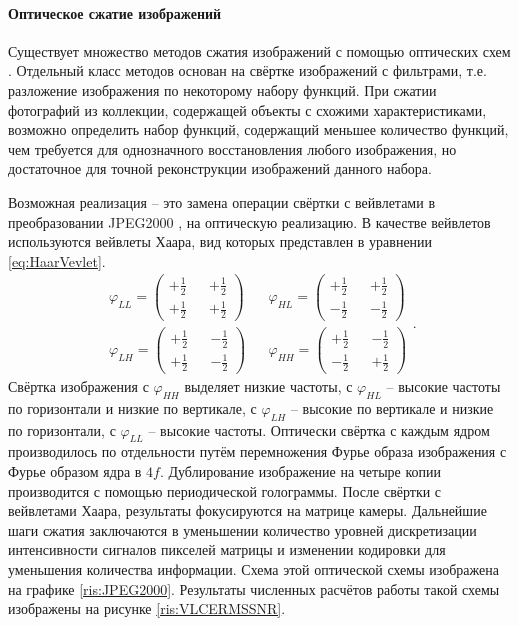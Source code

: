 \paragraph{Оптическое сжатие изображений}
Существует множество методов сжатия изображений с помощью оптических схем \cite{alfalou2009optical}. Отдельный класс методов основан на свёртке изображений с фильтрами, т.е. разложение изображения по некоторому набору функций. При сжатии фотографий из коллекции, содержащей объекты с схожими характеристиками, возможно определить набор функций, содержащий меньшее количество функций, чем требуется для однозначного восстановления любого изображения, но достаточное для точной реконструкции изображений данного набора.

\FloatBarrier\par
Возможная реализация -- это замена операции свёртки с вейвлетами \cite{alkholidi2008real} в преобразовании JPEG2000 \cite{lawson2002image}, на оптическую реализацию. В качестве вейвлетов используются вейвлеты Хаара, вид которых представлен в уравнении \ref{eq:HaarVevlet}.
\begin{equation}\label{eq:HaarVevlet}
	\begin{matrix}
		\varphi_{LL} = 
			\left(\begin{matrix} 
				+\frac{1}{2} && +\frac{1}{2} \\ +\frac{1}{2} && +\frac{1}{2} 
			\end{matrix}\right)
		&&
		\varphi_{HL} = 
		\left(\begin{matrix} 
			+\frac{1}{2} && +\frac{1}{2} \\ -\frac{1}{2} && -\frac{1}{2} 
		\end{matrix}\right)
		\\
		\varphi_{LH} = 
		\left(\begin{matrix} 
			+\frac{1}{2} && -\frac{1}{2} \\ +\frac{1}{2} && -\frac{1}{2} 
		\end{matrix}\right)
		&&
		\varphi_{HH} = 
		\left(\begin{matrix} 
			+\frac{1}{2} && -\frac{1}{2} \\ -\frac{1}{2} && +\frac{1}{2} 
		\end{matrix}\right)
	\end{matrix}.
\end{equation}
Свёртка изображения с $\varphi_{HH}$ выделяет низкие частоты, с $\varphi_{HL}$ -- высокие частоты по горизонтали и низкие по вертикале, с $\varphi_{LH}$ -- высокие по вертикале и низкие по горизонтали, с $\varphi_{LL}$ -- высокие частоты. Оптически свёртка с каждым ядром производилось по отдельности путём перемножения Фурье образа изображения с Фурье образом ядра в $4f$. Дублирование изображение на четыре копии производится с помощью периодической голограммы. После свёртки с вейвлетами Хаара, результаты фокусируются на матрице камеры. Дальнейшие шаги сжатия заключаются в уменьшении количество уровней дискретизации интенсивности сигналов пикселей матрицы и изменении кодировки для уменьшения количества информации. Схема этой оптической схемы изображена на графике \ref{ris:JPEG2000}. Результаты численных расчётов работы такой схемы изображены на рисунке \ref{ris:VLCERMSSNR}.
